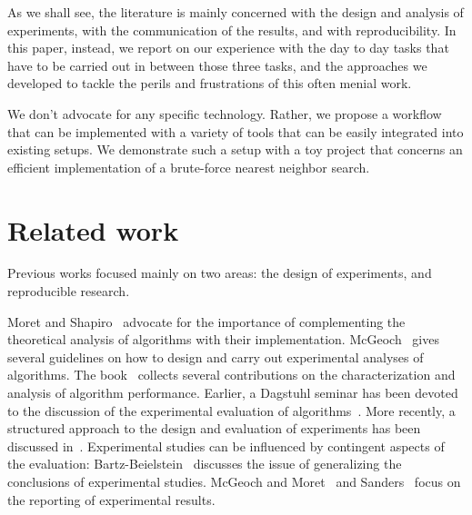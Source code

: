 \documentclass{llncs}
\begin{document}
As we shall see, the literature is mainly concerned with the design 
and analysis of
experiments, with the communication of the results,
and with reproducibility.
In this paper, instead, we report on our experience with the day to day
tasks that have to be carried out in between those three tasks, and
the approaches we developed to tackle the perils and frustrations of this 
often menial work.

We don't advocate for any specific technology. Rather, we propose a workflow
that can be implemented with a variety of tools that can be easily integrated
into existing setups. We demonstrate such a setup with a toy project that concerns an efficient implementation of a brute-force nearest neighbor search.

\section{Related work}

Previous works focused mainly on two areas: the design of experiments,
and reproducible research.

Moret and Shapiro~\cite{DBLP:journals/jucs/MoretS01} advocate for the
importance of complementing the theoretical analysis of algorithms
with their implementation.
McGeoch~\cite{DBLP:reference/algo/McGeoch08} gives several guidelines on how to
design and carry out experimental analyses of algorithms.
The book~\cite{DBLP:books/sp/2010BCPP} collects several contributions
on the characterization and analysis of algorithm performance.
Earlier, a Dagstuhl seminar has been devoted to the discussion of the
experimental evaluation of algorithms~\cite{DBLP:conf/dagstuhl/2000ea}.
More recently, a structured approach to the design and evaluation
of experiments has been discussed in~\cite{DBLP:series/ncs/Bartz-BeielsteinP14}.
%
Experimental studies can be influenced by contingent aspects
of the evaluation:
Bartz-Beielstein~\cite{DBLP:reference/sp/Bartz-Beielstein15} discusses
the issue of generalizing the conclusions of experimental studies.
%
McGeoch and Moret~\cite{DBLP:journals/sigact/McGeochM99} and Sanders~\cite{DBLP:conf/dagstuhl/Sanders00}
focus on the reporting of experimental results.
\end{document}
